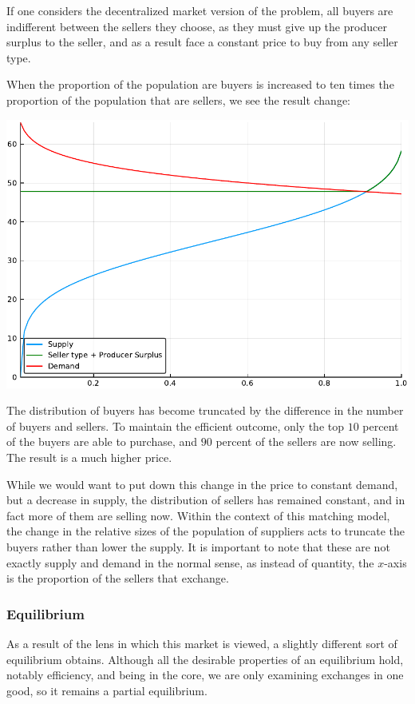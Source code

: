 \documentclass[12pt, letterpaper]{paper}
\begin{document}
If one considers the decentralized market version of the problem, all
buyers are indifferent between the sellers they choose, as they must
give up the producer surplus to the seller, and as a result face a
constant price to buy from any seller type. 

When the proportion of the population are buyers is increased to ten
times the proportion of the population that are sellers, we see the
result change:

\includegraphics[width=.9\linewidth]{../Scripts/oneTenth.pdf}

The distribution of buyers has become truncated by the difference in
the number of buyers and sellers. To maintain the efficient outcome,
only the top $10$ percent of the buyers are able to purchase, and $90$
percent of the sellers are now selling. The result is a much higher
price.

While we would want to put down this change in the price to constant
demand, but a decrease in supply, the distribution of sellers has
remained constant, and in fact more of them are selling now. Within
the context of this matching model, the change in the relative sizes
of the population of suppliers acts to truncate the buyers rather than
lower the supply. It is important to note that these are not exactly
supply and demand in the normal sense, as instead of quantity, the
$x$-axis is the proportion of the sellers that exchange.

\subsubsection{Equilibrium}
\label{sec-2-1-2}
As a result of the lens in which this market is viewed, a slightly
different sort of equilibrium obtains. Although all the desirable
properties of an equilibrium hold, notably efficiency, and being in
the core, we are only examining exchanges in one good, so it remains a
partial equilibrium.
\end{document}
